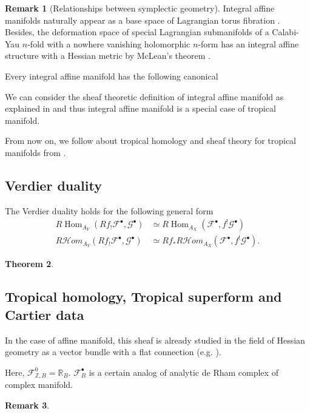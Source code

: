 \documentclass[a4paper,dvipdfmx,reqno,12pt]{amsart}
\theoremstyle{definition}
\newtheorem{Thm}{Theorem}[section]
\newtheorem{Rmk}[Thm]{Remark}
\newcommand{\R}{\mathbb{R}}%
\newcommand{\Z}{\mathbb{Z}}%
\newcommand{\mcal}[1]{\mathcal{#1}}%
\newcommand{\opn}[1]{\operatorname{#1}}
\numberwithin{equation}{section}
\begin{document}
\begin{Rmk}[{Relationships between symplectic geometry}]
Integral affine manifolds naturally appear 
as a base space of Lagrangian torus fibration 
\cite{duistermaatGlobalActionangleCoordinates1980a}. 
Besides, the deformation space of 
special Lagrangian submanifolds of
a Calabi-Yau $n$-fold with a nowhere vanishing 
holomorphic $n$-form has 
an integral affine structure with 
a Hessian metric by McLean's theorem \cite{MR1664890}.

Every integral affine manifold has the following canonical
\end{Rmk}

We can consider the sheaf theoretic definition of 
integral affine manifold as explained 
in \cite[2.1]{kontsevichAffineStructuresNonArchimedean2006a} 
and thus integral affine manifold is a special case of 
tropical manifold.

From now on, we follow about tropical homology and sheaf 
theory for tropical manifolds
from \cite{MR3903579,gross2019sheaftheoretic}.

\subsection{Verdier duality}
The Verdier duality holds for the following general form
\cite[Proposition 3.1.10]{MR1299726}
\begin{align}
  R\opn{Hom}_{A_Y}(R f_!\mcal{F}^{\bullet},\mcal{G}^{\bullet})    & \simeq R\opn{Hom}_{A_X}(\mcal{F}^{\bullet},f^{!}\mcal{G}^{\bullet})        \\
  R \mcal{H}om_{A_Y}(R f_! \mcal{F}^{\bullet},\mcal{G}^{\bullet}) & \simeq Rf_* R\mcal{H}om_{A_X}(\mcal{F}^{\bullet},f^{!}\mcal{G}^{\bullet}).
\end{align}

\begin{Thm}

\end{Thm}



\subsection{Tropical homology, Tropical superform and Cartier data}

In the case of affine manifold, this sheaf is already
studied in the field of Hessian geometry as a vector bundle
with a flat connection
(e.g. \cite[Chapter 7]{MR2293045}).


Here, $\mcal{F}_{\Z, B}^{0}=\R_B$. 
$\mcal{F}_{B}^{\bullet}$ is a certain analog of analytic
de Rham complex of complex manifold.
\begin{Rmk}

\end{Rmk}
\end{document}
